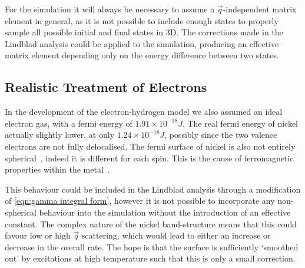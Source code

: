 For the  simulation
it will always
be necessary to assume a
\(\vec{q}\)-independent
matrix element in general,
as it is not possible
to include enough
states to properly
sample all possible initial
and final
states in 3D.
The corrections made in
the Lindblad analysis could
be applied to the simulation,
producing an effective matrix
element depending only
on the energy difference between
two states.


\subsection{Realistic Treatment of Electrons}
In the development
of the electron-hydrogen
model we also assumed
an ideal electron gas,
with a fermi energy
of \(1.91\times{}10^{-18}J\).
The real fermi energy
of nickel actually slightly lower,
at only \(1.24\times{} 10^{-18}J\),
possibly since the two
valence electrons are not
fully delocalised.
The fermi surface of nickel
is also not entirely
spherical~\cite{FermiSufaceNickel},
indeed it is different
for each spin.
This is the cause of
ferromagnetic properties
within the metal~\cite{PhysRev.49.537}.

This behaviour could
be included in the
Lindblad analysis through
a modification of \cref{eqn:gamma integral form},
however it is not possible
to incorporate any
non-spherical behaviour
into the simulation
without the introduction of
an effective constant.
The complex nature of
the nickel band-structure
means that this
could favour low or
high \(\vec{q}\) scattering,
which would lead to either an increase
or decrease in the
overall rate.
The hope
is that the surface
is sufficiently
`smoothed out' by
excitations at high
temperature such that
this is only a small
correction.